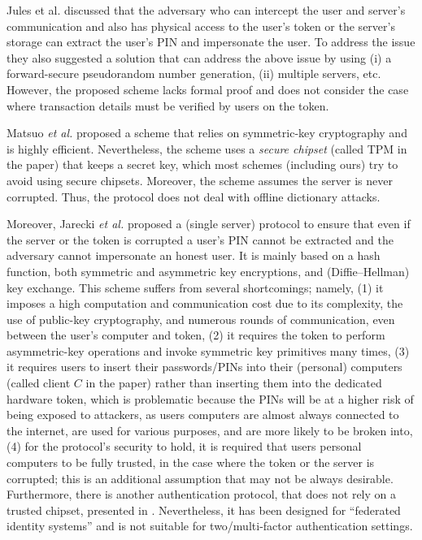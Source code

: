 \begin{enumerate}

Jules et al. \cite{juels2016configurable} discussed that the adversary who can intercept the user and server's communication and also has physical access to the user's token or the server's storage can extract the user's PIN and impersonate the user. To address the issue they also suggested a solution that can address the above issue by using (i) a forward-secure pseudorandom number generation, (ii) multiple servers, etc. However, the proposed scheme lacks formal proof and does not consider the case where transaction details must be verified by users on the token.  


Matsuo \textit{et al.} \cite{MatsuoMY11} proposed a scheme that relies on symmetric-key cryptography and is highly efficient. Nevertheless, the scheme uses a \emph{secure chipset} (called TPM in the paper) that keeps a secret key, which most schemes (including ours) try to avoid using secure chipsets. Moreover, the scheme assumes the server is never corrupted. Thus, the protocol does not deal with offline dictionary attacks. 




Moreover, Jarecki \textit{et al.} \cite{JareckiJKSS21} proposed a (single server) protocol to ensure that even if the server or the token is corrupted a user's PIN cannot be extracted and the adversary cannot impersonate an honest user. It is mainly based on a hash function, both symmetric and asymmetric key encryptions, and (Diffie–Hellman) key exchange. This scheme suffers from several shortcomings; namely, (1) it imposes a high computation and communication cost due to its complexity,  the use of public-key cryptography, and numerous rounds of communication, even between the user's computer and token, (2) it requires the token to perform asymmetric-key operations and invoke symmetric key primitives many times, (3) it requires users to insert their passwords/PINs into their (personal) computers (called client $C$ in the paper) rather than inserting them into the dedicated hardware token, which is problematic because the PINs will be at a higher risk of being exposed to attackers, as users computers are almost always connected to the internet, are used for various purposes, and are more likely to be broken into, (4) for the protocol's security to hold, it is required that users personal computers to be fully trusted, in the case where the token or the server is corrupted; this is an additional assumption that may not be always desirable. %
%
%
Furthermore, there is another authentication protocol, that does not rely on a trusted chipset, presented in \cite{zhang2020strong}. Nevertheless, it has been designed for ``federated identity systems'' and is not suitable for two/multi-factor authentication settings. 




\end{enumerate}
